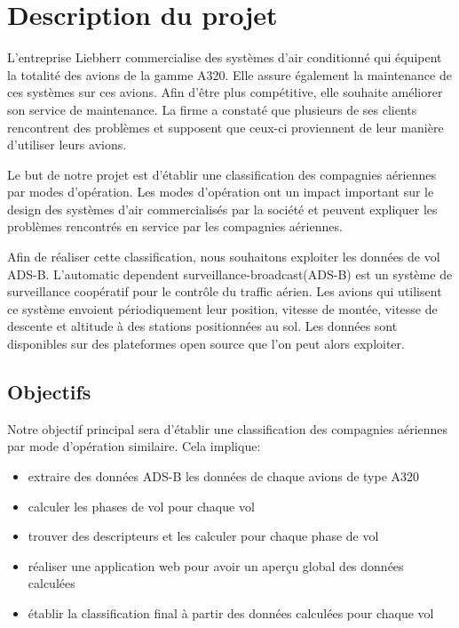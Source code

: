 \chapter*{Description du projet}
\label{chap:description}
L'entreprise Liebherr commercialise des systèmes d'air conditionné qui équipent
la totalité des avions de la gamme A320. Elle assure également la maintenance de ces systèmes sur ces avions. Afin d'être plus compétitive, elle souhaite améliorer son service de maintenance. La firme a constaté que plusieurs de ses clients rencontrent des problèmes et supposent que ceux-ci proviennent de leur manière d'utiliser leurs avions.

Le but de notre projet est d'établir une classification des compagnies aériennes par modes d'opération. Les modes d'opération ont un impact important sur le design des systèmes d'air commercialisés par la société et peuvent expliquer les problèmes rencontrés en service par les compagnies aériennes.

Afin de réaliser cette classification, nous souhaitons exploiter les données de vol ADS-B. L'automatic dependent surveillance-broadcast(ADS-B) est un système de surveillance coopératif pour le contrôle du traffic aérien. Les avions qui utilisent ce système envoient périodiquement leur position, vitesse de montée, vitesse de descente et altitude à des stations positionnées au sol. Les données sont disponibles sur des plateformes open source que l'on peut alors exploiter.

\section{Objectifs}
Notre objectif principal sera d'établir une classification des compagnies aériennes par mode d'opération similaire. Cela implique:

\begin{itemize}
	\item extraire des données ADS-B les données de chaque avions de type A320
	\item calculer les phases de vol pour chaque vol
	\item trouver des descripteurs et les calculer pour chaque phase de vol
	\item réaliser une application web pour avoir un aperçu global des données calculées
	\item établir la classification final à partir des données calculées pour chaque vol
\end{itemize}

